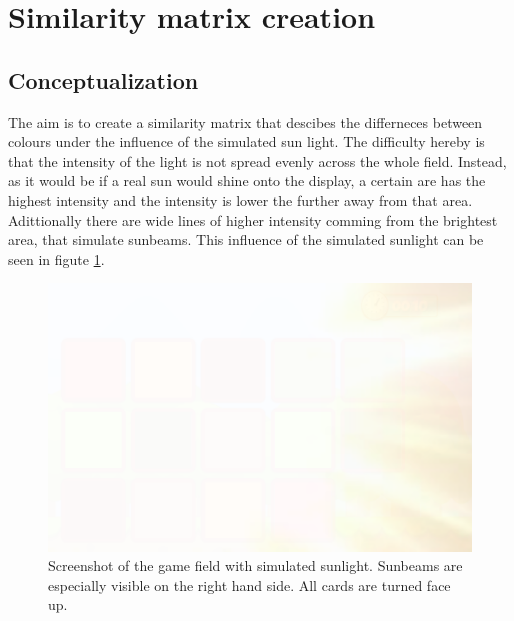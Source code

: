 \section{Similarity matrix creation}
\label{similarity_matrix_cretion}

\subsection{Conceptualization}
\label{conceptualization}
The aim is to create a similarity matrix that descibes the differneces between colours under the influence of the simulated sun light. The difficulty hereby is that the intensity of the light is not spread evenly across the whole field. Instead, as it would be if a real sun would shine onto the display, a certain are has the highest intensity and the intensity is lower the further away from that area. Adittionally there are wide lines of higher intensity comming from the brightest area, that simulate sunbeams. This influence of the simulated sunlight can be seen in figute \ref{fig:glareEffect}. 

\begin{figure}[H]
	\centering
	\includegraphics[width=14cm]{images/glareEffect.png}
	\caption[Bild kurz]{Screenshot of the game field with simulated sunlight. Sunbeams are especially visible on the right hand side. All cards are turned face up.}
	\label{fig:glareEffect}
\end{figure}

